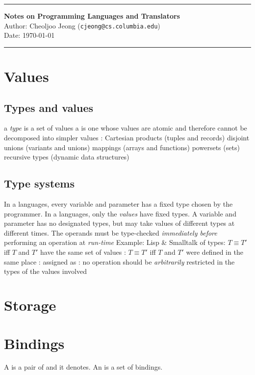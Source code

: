 \documentclass{myart}
\begin{document}
\small
\hrule
\vspace*{0.2cm}
\noindent
{\normalsize\bf Notes on Programming Languages and Translators}
\vspace*{0.1cm}\\
{\small{}Author: Cheoljoo Jeong (\tt{}cjeong@cs.columbia.edu})\\
{\small{}Date: \today}
\vspace*{0.2cm}
\hrule

\section{Values}
\subsection{Types and values}
\bit
\w a {\em type\/} is a set of values
\w a  is one whose values are atomic and
	therefore cannot be decomposed into simpler values
\w {}: 
	\bit
	\w Cartesian products (tuples and records)
	\w disjoint unions (variants and unions)
	\w mappings (arrays and functions)
	\w powersets (sets)
	\w recursive types (dynamic data structures)
	\eit
\eit
\subsection{Type systems}
\bit
\w In a  languages, every variable and parameter
	has a fixed type chosen by the programmer.
\w In a  languages, only the {\em values\/}
	have fixed types. 
	\bit
	\w A variable and parameter has no designated
	types, but may take values of different types at different
	times.
	\w The operands must be type-checked {\em immediately before\/}
	performing an operation at {\em run-time\/}
	\w Example: Lisp \& Smalltalk
	\eit
\w {} of types:
	$T \equiv T'$ iff $T$ and $T'$ have the same set of values
\w {}:
	$T \equiv T'$ iff $T$ and $T'$ were defined in the same place
\w {}: assigned as 
\w {}: no operation should be
	{\em arbitrarily\/} restricted in the types of the values involved
\eit



\section{Storage}
\section{Bindings}
\bit
\w A  is a pair of  and  it denotes.
\w An  is a set of bindings.
\w {}
\eit
\end{document}
